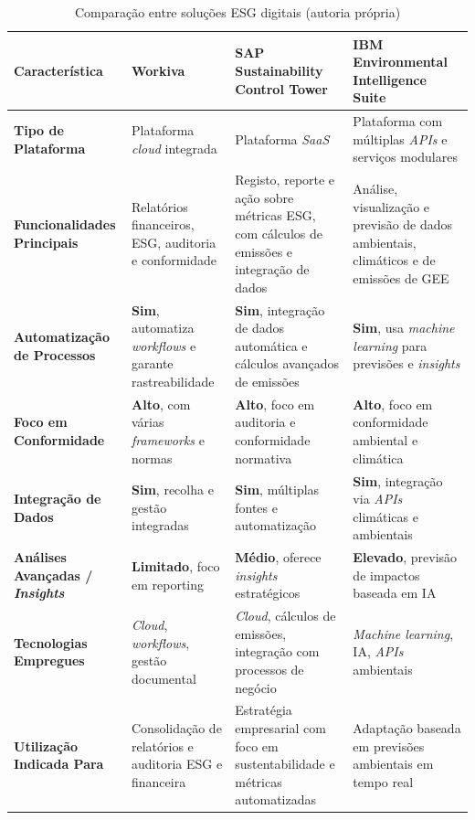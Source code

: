 \begin{table}[H]
\centering
\begin{tabular}{|p{2.6cm}|p{3.3cm}|p{4cm}|p{4cm}|}
\hline
\textbf{Característica} & \textbf{Workiva} & \textbf{SAP Sustainability Control Tower} & \textbf{IBM Environmental Intelligence Suite} \\
\hline
\textbf{Tipo de Plataforma} & Plataforma \textit{cloud} integrada & Plataforma \textit{\gls{SaaS}} & Plataforma com múltiplas \textit{APIs} e serviços modulares \\
\hline
\textbf{Funcionalidades Principais} & Relatórios financeiros, \gls{ESG}, auditoria e conformidade & Registo, reporte e ação sobre métricas \gls{ESG}, com cálculos de emissões e integração de dados & Análise, visualização e previsão de dados ambientais, climáticos e de emissões de \gls{GEE} \\
\hline
\textbf{Automatização de Processos} & \textbf{Sim}, automatiza \textit{workflows} e garante rastreabilidade & \textbf{Sim}, integração de dados automática e cálculos avançados de emissões & \textbf{Sim}, usa \textit{machine learning} para previsões e \textit{insights} \\
\hline
\textbf{Foco em Conformidade} & \textbf{Alto}, com várias \textit{frameworks} e normas & \textbf{Alto}, foco em auditoria e conformidade normativa & \textbf{Alto}, foco em conformidade ambiental e climática \\
\hline
\textbf{Integração de Dados} & \textbf{Sim}, recolha e gestão integradas & \textbf{Sim}, múltiplas fontes e automatização & \textbf{Sim}, integração via \textit{APIs} climáticas e ambientais \\
\hline
\textbf{Análises Avançadas / \textit{Insights}} & \textbf{Limitado}, foco em reporting & \textbf{Médio}, oferece \textit{insights} estratégicos & \textbf{Elevado}, previsão de impactos baseada em \gls{IA} \\
\hline
\textbf{Tecnologias Empregues} & \textit{Cloud}, \textit{workflows}, gestão documental & \textit{Cloud}, cálculos de emissões, integração com processos de negócio & \textit{Machine learning}, \gls{IA}, \textit{APIs} ambientais \\
\hline
\textbf{Utilização Indicada Para} & Consolidação de relatórios e auditoria \gls{ESG} e financeira & Estratégia empresarial com foco em sustentabilidade e métricas automatizadas & Adaptação baseada em previsões ambientais em tempo real \\
\hline
\end{tabular}
\caption{Comparação entre soluções ESG digitais (autoria própria)}
\label{tab:comparacao_solucoes_esg}
\end{table}


